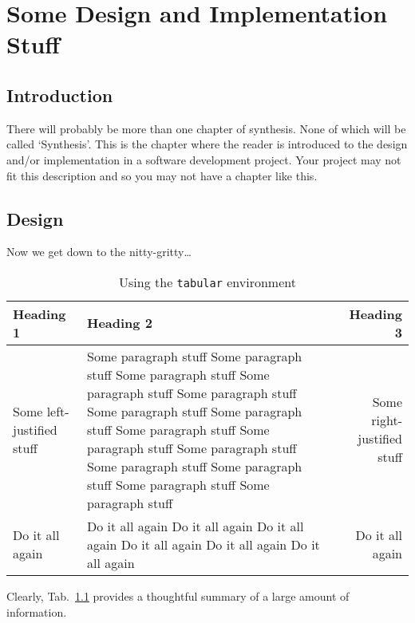 \chapter{Some Design and Implementation Stuff}\label{device}

\section{Introduction}
There will probably be more than one chapter of synthesis. None of
which will be called `Synthesis'. This is the chapter where the
reader is introduced to the design and/or implementation in a software
development project. Your project may not fit this description and so
you may not have a chapter like this.

\section{Design}

Now we get down to the nitty-gritty\ldots

\begin{table}[h]
\begin{tabular}{|l|p{}|r|}
\hline
\textbf{Heading 1} & \textbf{Heading 2} & \textbf{Heading 3} \\
\hline \hline
Some left-justified stuff &
Some paragraph stuff Some paragraph
stuff Some paragraph stuff Some paragraph
stuff Some paragraph stuff Some
paragraph stuff Some paragraph stuff
Some paragraph stuff Some paragraph
stuff Some paragraph stuff Some paragraph
stuff Some paragraph stuff Some
paragraph stuff Some paragraph stuff &
Some right-justified stuff \\
\hline
Do it all again &
Do it all again Do it all again Do it all
again Do it all again Do it all again Do
it all again &
Do it all again \\
\hline
\end{tabular}
\caption{Using the \texttt{tabular} environment\label{device:table}}
\end{table}

Clearly, Tab.~\ref{device:table} provides a thoughtful summary of a
large amount of information.
